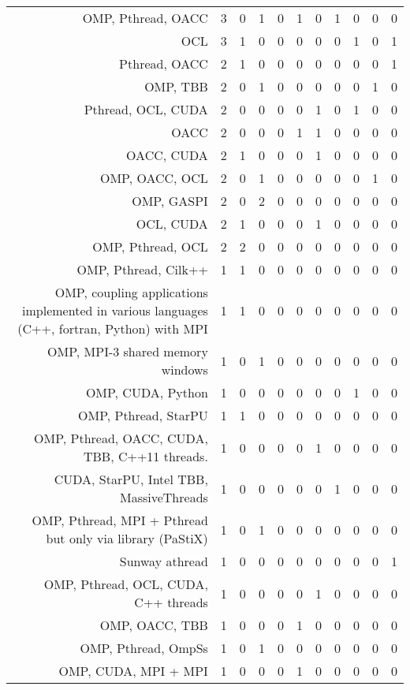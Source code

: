 {\begin{landscape}
\begin{longtable}[htb]{r|c|c|c|c|c|c|c|c|c|c}
{OMP, Pthread, OACC} & 3 & 0 & 1 & 0 & 1 & 0 & 1 & 0 & 0 & 0 \\%
{OCL} & 3 & 1 & 0 & 0 & 0 & 0 & 0 & 1 & 0 & 1 \\%
{Pthread, OACC} & 2 & 1 & 0 & 0 & 0 & 0 & 0 & 0 & 0 & 1 \\%
{OMP, TBB} & 2 & 0 & 1 & 0 & 0 & 0 & 0 & 0 & 1 & 0 \\%
{Pthread, OCL, CUDA} & 2 & 0 & 0 & 0 & 0 & 1 & 0 & 1 & 0 & 0 \\%
{OACC} & 2 & 0 & 0 & 0 & 1 & 1 & 0 & 0 & 0 & 0 \\%
{OACC, CUDA} & 2 & 1 & 0 & 0 & 0 & 1 & 0 & 0 & 0 & 0 \\%
{OMP, OACC, OCL} & 2 & 0 & 1 & 0 & 0 & 0 & 0 & 0 & 1 & 0 \\%
{OMP, GASPI} & 2 & 0 & 2 & 0 & 0 & 0 & 0 & 0 & 0 & 0 \\%
{OCL, CUDA} & 2 & 1 & 0 & 0 & 0 & 1 & 0 & 0 & 0 & 0 \\%
{OMP, Pthread, OCL} & 2 & 2 & 0 & 0 & 0 & 0 & 0 & 0 & 0 & 0 \\%
{OMP, Pthread, Cilk++} & 1 & 1 & 0 & 0 & 0 & 0 & 0 & 0 & 0 & 0 \\%
{OMP, coupling applications implemented in various languages (C++, fortran, Python) with MPI} & 1 & 1 & 0 & 0 & 0 & 0 & 0 & 0 & 0 & 0 \\%
{OMP, MPI-3 shared memory windows} & 1 & 0 & 1 & 0 & 0 & 0 & 0 & 0 & 0 & 0 \\%
{OMP, CUDA, Python} & 1 & 0 & 0 & 0 & 0 & 0 & 0 & 1 & 0 & 0 \\%
{OMP, Pthread, StarPU} & 1 & 1 & 0 & 0 & 0 & 0 & 0 & 0 & 0 & 0 \\%
{OMP, Pthread, OACC, CUDA, TBB, C++11 threads.} & 1 & 0 & 0 & 0 & 0 & 1 & 0 & 0 & 0 & 0 \\%
{CUDA, StarPU, Intel TBB, MassiveThreads} & 1 & 0 & 0 & 0 & 0 & 0 & 1 & 0 & 0 & 0 \\%
{OMP, Pthread, MPI + Pthread but only via library (PaStiX)} & 1 & 0 & 1 & 0 & 0 & 0 & 0 & 0 & 0 & 0 \\%
{Sunway athread} & 1 & 0 & 0 & 0 & 0 & 0 & 0 & 0 & 0 & 1 \\%
{OMP, Pthread, OCL, CUDA, C++ threads} & 1 & 0 & 0 & 0 & 0 & 1 & 0 & 0 & 0 & 0 \\%
{OMP, OACC, TBB} & 1 & 0 & 0 & 0 & 1 & 0 & 0 & 0 & 0 & 0 \\%
{OMP, Pthread, OmpSs} & 1 & 0 & 1 & 0 & 0 & 0 & 0 & 0 & 0 & 0 \\%
{OMP, CUDA, MPI + MPI} & 1 & 0 & 0 & 0 & 1 & 0 & 0 & 0 & 0 & 0 \\%

\end{longtable}
\end{landscape}}
